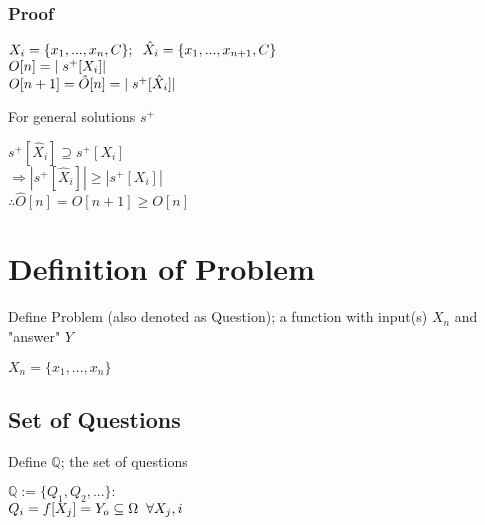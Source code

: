 \documentclass[11pt]{article}
\begin{document}
\subsubsection{Proof}
\begin{center}
$
X_i = \{x_1,...,x_n,C\}; \hspace{2mm} \hat{X}_i = \{x_1,...,x_{n+1},C\}
$
\\ \vspace{4mm}
$
O[n] = |\hspace{1mm} s^+[X_i]|
$
\\ \vspace{2mm}
$
O[n+1] = \hat{O}[n] = |\hspace{1mm} s^+[\hat{X}_i]|
$
\end{center}
\hspace{4mm}
For general solutions $s^+$
\begin{center}
$
s^+[\hat{X}_i] \supseteq s^+[X_i] 
$
\\ \vspace{2mm}
$
\Rightarrow |s^+[\hat{X}_i]| \geq |s^+[X_i]|
$
\\ \vspace{2mm}
$
\therefore \hat{O}[n] = O[n+1] \geq O[n]
$
\end{center}













\newpage

\section{Definition of Problem}
Define Problem (also denoted as Question); a function with input(s) $X_n$ and "answer" $Y$
\begin{center}
$
X_n = \{x_1,...,x_n\}
$
\end{center}
\subsection{Set of Questions}
Define $\mathbb{Q}$; the set of questions
\begin{center}
$
\mathbb{Q} := \{Q_1,Q_2,...\}:
$
\\ \vspace{2mm}
$
Q_i = f[X_j] = Y_o \subseteq \Omega \hspace{2mm} \forall X_j, i
$
\end{center}
\end{document}
